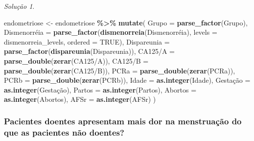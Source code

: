 \documentclass[
]{latex/krantz}
\newenvironment{Shaded}{\begin{snugshade}}{\end{snugshade}}
\newcommand{\AttributeTok}[1]{\textcolor[rgb]{0.13,0.29,0.53}{#1}}
\newcommand{\ConstantTok}[1]{\textcolor[rgb]{0.56,0.35,0.01}{#1}}
\newcommand{\FunctionTok}[1]{\textcolor[rgb]{0.13,0.29,0.53}{\textbf{#1}}}
\newcommand{\NormalTok}[1]{#1}
\newcommand{\OtherTok}[1]{\textcolor[rgb]{0.56,0.35,0.01}{#1}}
\newcommand{\SpecialCharTok}[1]{\textcolor[rgb]{0.81,0.36,0.00}{\textbf{#1}}}
\newcommand{\StringTok}[1]{\textcolor[rgb]{0.31,0.60,0.02}{#1}}
\theoremstyle{definition}
\theoremstyle{definition}
\theoremstyle{definition}
\theoremstyle{definition}
\theoremstyle{remark}
\newtheorem*{solution}{Solução}
\begin{document}
\begin{solution}
\begin{Shaded}
\begin{Highlighting}[]
\NormalTok{endometriose }\OtherTok{\textless{}{-}}\NormalTok{ endometriose }\SpecialCharTok{\%\textgreater{}\%}
                  \FunctionTok{mutate}\NormalTok{(}
                    \AttributeTok{Grupo =} \FunctionTok{parse\_factor}\NormalTok{(Grupo),}
\NormalTok{                    Dismenorréia }\OtherTok{=} \FunctionTok{parse\_factor}\NormalTok{(}\FunctionTok{dismenorreia}\NormalTok{(Dismenorréia), }\AttributeTok{levels =}\NormalTok{ dismenorreia\_levels, }\AttributeTok{ordered =} \ConstantTok{TRUE}\NormalTok{),}
                    \AttributeTok{Dispareunia =} \FunctionTok{parse\_factor}\NormalTok{(}\FunctionTok{dispareunia}\NormalTok{(Dispareunia)),}
                    \StringTok{\textasciigrave{}}\AttributeTok{CA125/A}\StringTok{\textasciigrave{}} \OtherTok{=} \FunctionTok{parse\_double}\NormalTok{(}\FunctionTok{zerar}\NormalTok{(}\StringTok{\textasciigrave{}}\AttributeTok{CA125/A}\StringTok{\textasciigrave{}}\NormalTok{)),}
                    \StringTok{\textasciigrave{}}\AttributeTok{CA125/B}\StringTok{\textasciigrave{}} \OtherTok{=} \FunctionTok{parse\_double}\NormalTok{(}\FunctionTok{zerar}\NormalTok{(}\StringTok{\textasciigrave{}}\AttributeTok{CA125/B}\StringTok{\textasciigrave{}}\NormalTok{)),}
                    \AttributeTok{PCRa =} \FunctionTok{parse\_double}\NormalTok{(}\FunctionTok{zerar}\NormalTok{(PCRa)),}
                    \AttributeTok{PCRb =} \FunctionTok{parse\_double}\NormalTok{(}\FunctionTok{zerar}\NormalTok{(PCRb)),}
                    \AttributeTok{Idade =} \FunctionTok{as.integer}\NormalTok{(Idade),}
\NormalTok{                    Gestação }\OtherTok{=} \FunctionTok{as.integer}\NormalTok{(Gestação),}
                    \AttributeTok{Partos =} \FunctionTok{as.integer}\NormalTok{(Partos),}
                    \AttributeTok{Abortos =} \FunctionTok{as.integer}\NormalTok{(Abortos),}
                    \AttributeTok{AFSr =} \FunctionTok{as.integer}\NormalTok{(AFSr)}
\NormalTok{                  )}
\end{Highlighting}
\end{Shaded}

\hypertarget{pacientes-doentes-apresentam-mais-dor-na-menstruauxe7uxe3o-do-que-as-pacientes-nuxe3o-doentes}{%
\subsubsection*{Pacientes doentes apresentam mais dor na menstruação do que as pacientes não doentes?}\label{pacientes-doentes-apresentam-mais-dor-na-menstruauxe7uxe3o-do-que-as-pacientes-nuxe3o-doentes}}


\end{solution}
\end{document}

